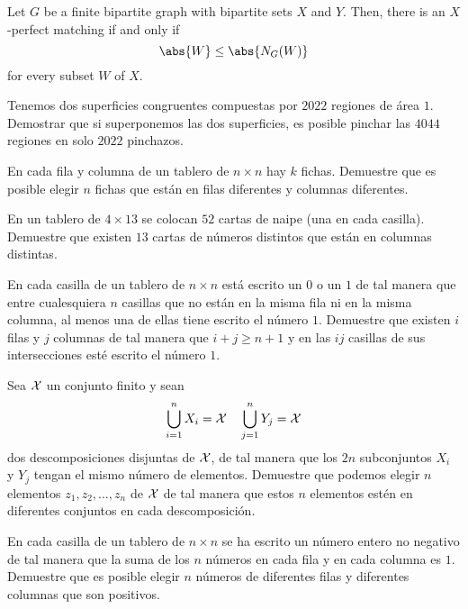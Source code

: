 \note[Combinatoria]{}

\begin{theorem}
  Let $G$ be a finite bipartite graph with bipartite sets $X$ and $Y$. Then,
  there is an $X$-perfect matching if and only if
  \[\abs{W}\le\abs{N_G(W)}\]
  for every subset $W$ of $X$.
\end{theorem}

\begin{probEG}
  Tenemos dos superficies congruentes compuestas por $2022$ regiones de área
  $1$. Demostrar que si superponemos las dos superficies, es posible pinchar las
  $4044$ regiones en solo $2022$ pinchazos.
\end{probEG}

\begin{probEG}
  En cada fila y columna de un tablero de $n\times n$ hay $k$ fichas. Demuestre
  que es posible elegir $n$ fichas que están en filas diferentes y columnas
  diferentes.
\end{probEG}

\begin{probEG}
  En un tablero de $4\times 13$ se colocan $52$ cartas de naipe (una en cada
  casilla). Demuestre que existen $13$ cartas de números distintos que están en
  columnas distintas.
\end{probEG}

\begin{probEB}
  En cada casilla de un tablero de $n\times n$ está escrito un $0$ o un $1$ de
  tal manera que entre cualesquiera $n$ casillas que no están en la misma fila
  ni en la misma columna, al menos una de ellas tiene escrito el número $1$.
  Demuestre que existen $i$ filas y $j$ columnas de tal manera que $i+j\ge n+1$
  y en las $ij$ casillas de sus intersecciones esté escrito el número $1$.
\end{probEB}

\begin{probEG}
  Sea $\cal X$ un conjunto finito y sean
  \[\bigcup_{i=1}^n X_i={\cal X}\quad\bigcup_{j=1}^n Y_j={\cal X}\]
  dos descomposiciones disjuntas de $\cal X$, de tal manera que los $2n$
  subconjuntos $X_i$ y $Y_j$ tengan el mismo número de elementos. Demuestre que
  podemos elegir $n$ elementos $z_1,z_2,\dots,z_n$ de $\cal X$ de tal manera que
  estos $n$ elementos estén en diferentes conjuntos en cada descomposición.
\end{probEG}

\begin{probEG}
  En cada casilla de un tablero de $n\times n$ se ha escrito un número entero no
  negativo de tal manera que la suma de los $n$ números en cada fila y en cada
  columna es $1$. Demuestre que es posible elegir $n$ números de diferentes
  filas y diferentes columnas que son positivos.
\end{probEG}

